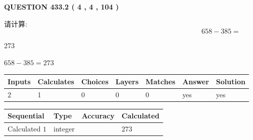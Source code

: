 \documentclass{ctexart}
\begin{document}
   
  
\vspace{0.2in}
  
{\textbf{\Large{QUESTION
433.2 
 ( 4 , 4 , 104 )
}}}
  
  
 
请计算:
\begin{equation}
658 -   %
385 = \nonumber
\end{equation}
 
 
 
\noindent{}
 
 

273
 
 
\noindent{}
 
 

 
 
 
\noindent{}
 
 

$ %
658 -  %
385=   %
273$
 
 
\noindent{}
 
 

 
   
   
   
   
\noindent\begin{tabular}{|l|l|l|l|l|l|l|}
 \hline
Inputs & Calculates & Choices & Layers & Matches & Answer & Solution \\ \hline
 2  & 
 1  & 
 0
  & 
 0  & 
 0  & 
  yes & 
  yes 
  \\ \hline
 \end{tabular}
   
   
   
   
\noindent{}
   
   
  
  
\noindent\begin{tabular}{|l|l|l|l|}
\hline
 Sequential & Type & Accuracy & Calculated \\ 
\hline
 
 
  Calculated $  1 $ & integer &  & 
  $ 273 $ 
 \\  \hline  
 \end{tabular}
   
\end{document}
